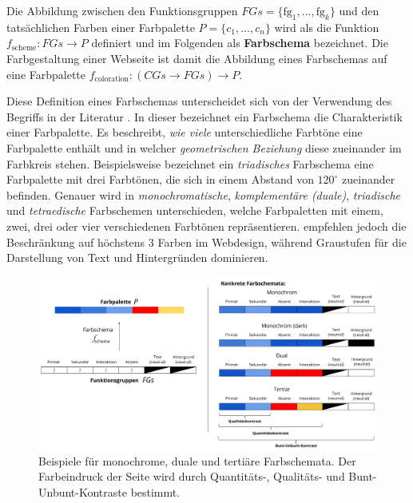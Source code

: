 Die Abbildung zwischen den Funktionsgruppen $FGs = \{\text{fg}_1, ... , \text{fg}_k\}$ und den tatsächlichen Farben einer Farbpalette $P = \{c_1, ... , c_n\}$ wird als die Funktion $f_\text{scheme}: FGs \to P$ definiert und im Folgenden als \textbf{Farbschema} bezeichnet. Die Farbgestaltung einer Webseite ist damit die Abbildung eines Farbschemas auf eine Farbpalette $f_\text{coloration}: (CGs \to FGs) \to P$.

Diese Definition eines Farbschemas unterscheidet sich von der Verwendung des Begriffs in der Literatur \citep{webdesign}. In dieser bezeichnet ein Farbschema die Charakteristik einer Farbpalette. Es beschreibt, \emph{wie viele} unterschiedliche Farbtöne eine Farbpalette enthält und in welcher \emph{geometrischen Beziehung} diese zueinander im Farbkreis stehen. Beispielsweise bezeichnet ein \emph{triadisches} Farbschema eine Farbpalette mit drei Farbtönen, die sich in einem Abstand von $120^{\circ}$ zueinander befinden. Genauer wird in  \emph{monochromatische}, \emph{komplementäre (duale)}, \emph{triadische} und \emph{tetraedische} Farbschemen unterschieden, welche Farbpaletten mit einem, zwei, drei oder vier verschiedenen Farbtönen repräsentieren. \citep{underestimated, smashing, google} empfehlen jedoch die Beschränkung auf höchstens 3 Farben im Webdesign, während Graustufen für die Darstellung von Text und Hintergründen dominieren.

\begin{figure}[]
	\centering
	\includegraphics[width=1\textwidth]{img/colorschemes.png}
	\caption{Beispiele für monochrome, duale und tertiäre Farbschemata. Der Farbeindruck der Seite wird durch Quantitäts-, Qualitäts- und Bunt-Unbunt-Kontraste bestimmt.}
	\label{fig:colorschemes}
\end{figure}
    
